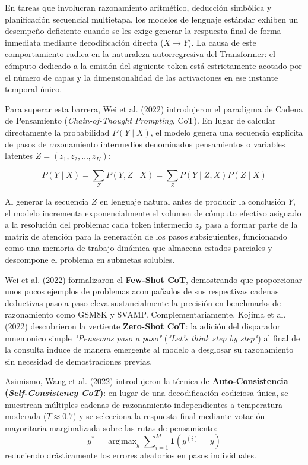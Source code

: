 En tareas que involucran razonamiento aritmético, deducción simbólica y planificación secuencial multietapa, los modelos de lenguaje estándar exhiben un desempeño deficiente cuando se les exige generar la respuesta final de forma inmediata mediante decodificación directa ($X \to Y$). La causa de este comportamiento radica en la naturaleza autorregresiva del Transformer: el cómputo dedicado a la emisión del siguiente token está estrictamente acotado por el número de capas y la dimensionalidad de las activaciones en ese instante temporal único.

Para superar esta barrera, Wei et al. (2022) introdujeron el paradigma de Cadena de Pensamiento (\textit{Chain-of-Thought Prompting}, CoT). En lugar de calcular directamente la probabilidad $P(Y \mid X)$, el modelo genera una secuencia explícita de pasos de razonamiento intermedios denominados pensamientos o variables latentes $Z = (z_1, z_2, \dots, z_K)$:

\begin{equation}
P(Y \mid X) = \sum_Z P(Y, Z \mid X) = \sum_Z P(Y \mid Z, X) P(Z \mid X)
\end{equation}

Al generar la secuencia $Z$ en lenguaje natural antes de producir la conclusión $Y$, el modelo incrementa exponencialmente el volumen de cómputo efectivo asignado a la resolución del problema: cada token intermedio $z_k$ pasa a formar parte de la matriz de atención para la generación de los pasos subsiguientes, funcionando como una memoria de trabajo dinámica que almacena estados parciales y descompone el problema en submetas solubles.

Wei et al. (2022) formalizaron el \textbf{Few-Shot CoT}, demostrando que proporcionar unos pocos ejemplos de problemas acompañados de sus respectivas cadenas deductivas paso a paso eleva sustancialmente la precisión en benchmarks de razonamiento como GSM8K y SVAMP. Complementariamente, Kojima et al. (2022) descubrieron la vertiente \textbf{Zero-Shot CoT}: la adición del disparador mnemonico simple \textit{"Pensemos paso a paso"} (\textit{"Let's think step by step"}) al final de la consulta induce de manera emergente al modelo a desglosar su razonamiento sin necesidad de demostraciones previas.

Asimismo, Wang et al. (2022) introdujeron la técnica de \textbf{Auto-Consistencia (\textit{Self-Consistency CoT})}: en lugar de una decodificación codiciosa única, se muestrean múltiples cadenas de razonamiento independientes a temperatura moderada ($T \approx 0.7$) y se selecciona la respuesta final mediante votación mayoritaria marginalizada sobre las rutas de pensamiento:
\begin{equation}
y^* = \operatorname{arg\,max}_y \sum\nolimits_{i=1}^M \mathbf{1}(y^{(i)} = y)
\end{equation}
reduciendo drásticamente los errores aleatorios en pasos individuales.


